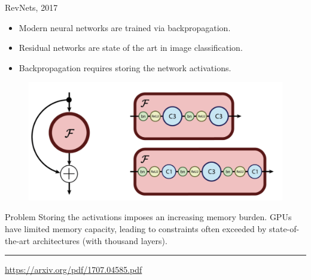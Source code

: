 \documentclass{beamer}
\begin{document}
\begin{frame}{RevNets, 2017}
	\begin{minipage}[t]{0.6\columnwidth}
		\begin{itemize}
			\item Modern neural networks are trained via backpropagation.
			\item Residual networks are state of the art in image classification.
			\item Backpropagation requires storing the network activations.
		\end{itemize}
	\end{minipage}%
	\begin{minipage}[t]{0.4\columnwidth}
		\begin{figure}
			\centering
			\includegraphics[width=\linewidth]{figs/resnet_block.png}
		\end{figure}
	\end{minipage}
	\vspace{0.1cm}
	\begin{block}{Problem}
		Storing the activations imposes an increasing memory burden. GPUs have limited memory capacity, leading to constraints often exceeded by state-of-the-art architectures (with thousand layers).
	\end{block}
	\vfill
	\hrule\medskip
	{\scriptsize \href{https://arxiv.org/pdf/1707.04585.pdf}{https://arxiv.org/pdf/1707.04585.pdf}} 
\end{frame}
\end{document}
